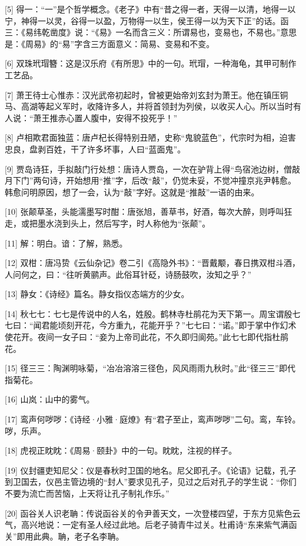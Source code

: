 \documentclass[12pt,UTF8]{ctexbook}
\begin{document}
[5] 得一：“一”是个哲学概念。《老子》中有“昔之得一者，天得一以清，地得一以宁，神得一以灵，谷得一以盈，万物得一以生，侯王得一以为天下正”的话。函三：《易纬乾凿度》说：“《易》一名而含三义：所谓易也，变易也，不易也。”意思是：《周易》的“易”字含三方面意义：简易、变易和不变。

[6] 双珠玳瑁簪：这是汉乐府《有所思》中的一句。玳瑁，一种海龟，其甲可制作工艺品。

[7] 萧王待士心惟赤：汉光武帝初起时，曾被更始帝刘玄封为萧王。他在镇压铜马、高湖等起义军时，收降许多人，并将首领封为列侯，以收买人心。所以当时有人说：“萧王推赤心置人腹中，安得不投死乎！”

[8] 卢相欺君面独蓝：唐卢杞长得特别丑陋，史称“鬼貌蓝色”，代宗时为相，迫害忠良，盘剥百姓，干了许多坏事，人曰“蓝面鬼”。

[9] 贾岛诗狂，手拟敲门行处想：唐诗人贾岛，一次在驴背上得“鸟宿池边树，僧敲月下门”两句诗，开始想用“推”字，后改“敲”，仍觉未妥，不觉冲撞京兆尹韩愈。韩愈问明原因，想了一会，认为“敲”字好。这就是“推敲”一语的由来。

[10] 张颠草圣，头能濡墨写时酣：唐张旭，善草书，好酒，每次大醉，则呼叫狂走，或把墨水浇到头上，然后写字，时人称他为“张颠”。

[11] 解：明白。谙：了解，熟悉。

[12] 双柑：唐冯贽《云仙杂记》卷二引《高隐外书》：“晋戴颙，春日携双柑斗酒，人问何之，曰：“往听黄鹂声。此俗耳针砭，诗肠鼓吹，汝知之乎？”

[13] 静女：《诗经》篇名。静女指仪态端方的少女。

[14] 秋七七：七七是传说中的人名，姓殷。鹤林寺杜鹃花为天下第一。周宝谓殷七七曰：“闻君能顷刻开花，今方重九，花能开乎？”七七曰：“诺。”即于掌中作幻术使花开。夜间一女子曰：“妾为上帝司此花，不久即归阆苑。”此七七即代指杜鹃花。

[15] 径三三：陶渊明咏菊，“冶冶溶溶三径色，风风雨雨九秋时。”此“径三三”即代指菊花。

[16] 山岚：山中的雾气。

[17] 鸾声何哕哕：《诗经·小雅·庭燎》有“君子至止，鸾声哕哕”二句。鸾，车铃。哕，乐声。

[18] 虎视正眈眈：《周易·颐卦》中的一句。眈眈，注视的样子。

[19] 仪封疆吏知尼父：仪是春秋时卫国的地名。尼父即孔子。《论语》记载，孔子到卫国去，仪邑主管边境的“封人”要求见孔子，见过之后对孔子的学生说：“你们不要为流亡而苦恼，上天将让孔子制礼作乐。”

[20] 函谷关人识老聃：传说函谷关的令尹善天文，一次登楼四望，于东方见紫色云气，高兴地说：一定有圣人经过此地。后老子骑青牛过关。杜甫诗“东来紫气满函关”即用此典。聃，老子名李聃。
\end{document}
